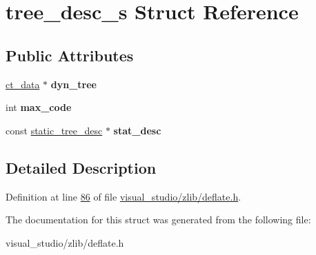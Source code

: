\hypertarget{structtree__desc__s}{}\section{tree\+\_\+desc\+\_\+s Struct Reference}
\label{structtree__desc__s}
\subsection*{Public Attributes}
\begin{DoxyCompactItemize}
\item 
\mbox{\label{structtree__desc__s_ad3010c1d14af0e1b1ff246efc3b9064e}} 
\hyperlink{structct__data__s}{ct\+\_\+data} $\ast$ {\bfseries dyn\+\_\+tree}
\item 
\mbox{\label{structtree__desc__s_a11f42f2c0464693def462dcfdd871002}} 
int {\bfseries max\+\_\+code}
\item 
\mbox{\label{structtree__desc__s_af82d519a7d9dcec972cebf77fb10177e}} 
const \hyperlink{structstatic__tree__desc__s}{static\+\_\+tree\+\_\+desc} $\ast$ {\bfseries stat\+\_\+desc}
\end{DoxyCompactItemize}


\subsection{Detailed Description}


Definition at line \hyperlink{visual__studio_2zlib_2deflate_8h_source_l00086}{86} of file \hyperlink{visual__studio_2zlib_2deflate_8h_source}{visual\+\_\+studio/zlib/deflate.\+h}.



The documentation for this struct was generated from the following file\+:\begin{DoxyCompactItemize}
\item 
visual\+\_\+studio/zlib/deflate.\+h\end{DoxyCompactItemize}
